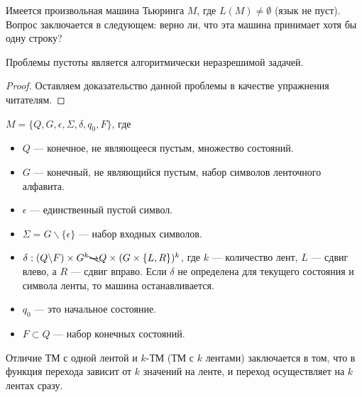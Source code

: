     \begin{Def}
        Имеется произвольная машина Тьюринга $M$, где $L(M) \neq \emptyset$ (язык не пуст). Вопрос заключается в следующем: верно ли, что эта машина принимает хотя бы одну строку?
    \end{Def}
    \begin{Thm}
        Проблемы пустоты является алгоритмически неразрешимой задачей.
    \end{Thm}
    \begin{proof}
        Оставляем доказательство данной проблемы в качестве упражнения читателям.
    \end{proof}
    
    
    \begin{Def}
    $M = \{Q, G, \epsilon, \Sigma, \delta, q_0, F\}$, где
    \begin{itemize}
        \item $Q$ --- конечное, не являющееся пустым, множество состояний.
        \item $G$ --- конечный, не являющийся пустым, набор символов ленточного алфавита.
        \item $\epsilon$ --- единственный пустой символ.
        \item $\Sigma = G \backslash \{\epsilon\}$ --- набор входных символов.
        \item $\delta : (Q \backslash F) \times G^k \bcancel{\rightarrow}
        Q \times (G \times \{L, R\})^k$, где $k$ --- количество лент, $L$ --- сдвиг влево, а $R$ --- сдвиг вправо. Если $\delta$ не определена для текущего состояния и символа ленты, то машина останавливается.
        \item $q_0$ --- это начальное состояние.
        \item $F \subset {Q}$  --- набор конечных состояний.
    \end{itemize}
    \end{Def}
    \begin{Rem}
        Отличие ТМ с одной лентой и $k$-ТМ (ТМ с $k$ лентами) заключается в том, что в функция перехода зависит от $k$ значений на ленте, и переход осуществляет на $k$ лентах сразу.
    \end{Rem}


